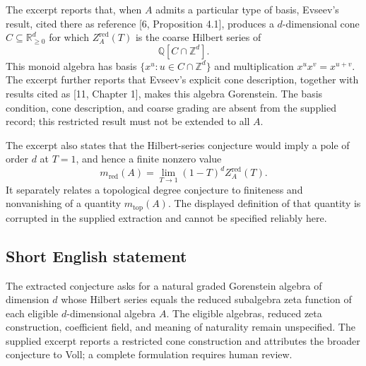 \documentclass[11pt]{article}
\newcommand{\Z}{\mathbb{Z}}
\newcommand{\Q}{\mathbb{Q}}
\newcommand{\R}{\mathbb{R}}
\begin{document}
The excerpt reports that, when \(A\) admits a particular type of basis, Evseev's result, cited there as reference [6, Proposition 4.1], produces a \(d\)-dimensional cone \(C\subseteq\R_{\geq 0}^{d}\) for which \(Z_A^{\mathrm{red}}(T)\) is the coarse Hilbert series of
\[
\Q[C\cap\Z^d].
\]
This monoid algebra has basis \(\{x^u:u\in C\cap\Z^d\}\) and multiplication \(x^ux^v=x^{u+v}\). The excerpt further reports that Evseev's explicit cone description, together with results cited as [11, Chapter 1], makes this algebra Gorenstein. The basis condition, cone description, and coarse grading are absent from the supplied record; this restricted result must not be extended to all \(A\).

The excerpt also states that the Hilbert-series conjecture would imply a pole of order \(d\) at \(T=1\), and hence a finite nonzero value
\[
m_{\mathrm{red}}(A)=\lim_{T\to 1}(1-T)^d Z_A^{\mathrm{red}}(T).
\]
It separately relates a topological degree conjecture to finiteness and nonvanishing of a quantity \(m_{\mathrm{top}}(A)\). The displayed definition of that quantity is corrupted in the supplied extraction and cannot be specified reliably here.
\subsection{Short English statement}
The extracted conjecture asks for a natural graded Gorenstein algebra of dimension \(d\) whose Hilbert series equals the reduced subalgebra zeta function of each eligible \(d\)-dimensional algebra \(A\). The eligible algebras, reduced zeta construction, coefficient field, and meaning of naturality remain unspecified. The supplied excerpt reports a restricted cone construction and attributes the broader conjecture to Voll; a complete formulation requires human review.
\end{document}
